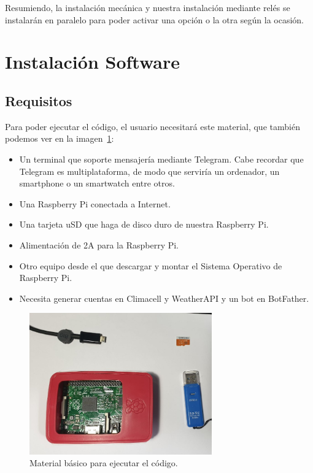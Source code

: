 Resumiendo, la instalación mecánica y nuestra instalación mediante relés se instalarán en paralelo para poder activar una opción o la otra según la ocasión.


\section{Instalación Software}

\subsection{Requisitos}
Para poder ejecutar el código, el usuario necesitará este material, que también podemos ver en la imagen~\ref{material}:
\begin{itemize}
    \item Un terminal que soporte mensajería mediante Telegram. Cabe recordar que Telegram es multiplataforma, de modo que serviría un ordenador, un smartphone o un smartwatch entre otros.
    \item Una Raspberry Pi conectada a Internet.
    \item Una tarjeta uSD que haga de disco duro de nuestra Raspberry Pi.
    \item Alimentación de 2A para la Raspberry Pi.
    \item Otro equipo desde el que descargar y montar el Sistema Operativo de Raspberry Pi.
    \item Necesita generar cuentas en Climacell y WeatherAPI y un bot en BotFather.
\end{itemize}

\begin{figure}[!h]
\centering
\includegraphics[width=0.7\textwidth]{img/fotos/RbP+SD+pen.jpeg}
\caption{Material básico para ejecutar el código.}\label{material}
\end{figure}

